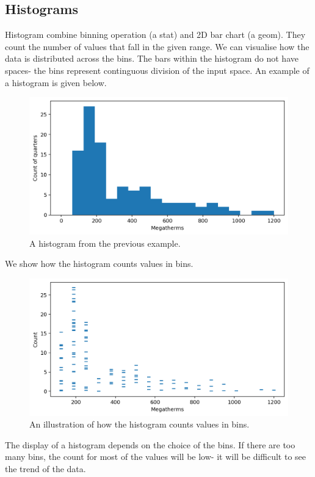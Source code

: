 \documentclass[a4paper, openany]{memoir}
\begin{document}
\subsection{Histograms}
Histogram combine binning operation (a stat) and 2D bar chart (a geom). They count the number of values that fall in the given range. We can visualise how the data is distributed across the bins. The bars within the histogram do not have spaces- the bins represent continguous division of the input space. An example of a histogram is given below.
\begin{figure}[H]
    \centering
    \includegraphics[scale=0.4]{src/2.24 Gas Example Plot 9.png}
    \caption{A histogram from the previous example.}
\end{figure}
\noindent We show how the histogram counts values in bins.
\begin{figure}[H]
    \centering
    \includegraphics[scale=0.4]{src/2.25 Gas Example Plot 10.png}
    \caption{An illustration of how the histogram counts values in bins.}
\end{figure}
The display of a histogram depends on the choice of the bins. If there are too many bins, the count for  most of the values will be low- it will be difficult to see the trend of the data.
\end{document}
